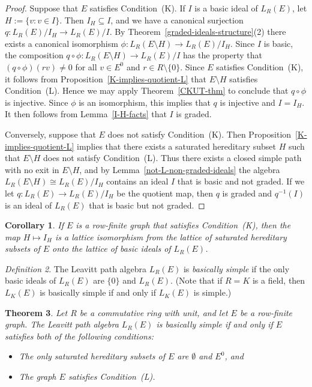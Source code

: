 \documentclass[11pt]{amsart}
\newtheorem{theorem}{Theorem}[section]
\newtheorem{corollary}[theorem]{Corollary}
\theoremstyle{remark}
\newtheorem{definition}[theorem]{Definition}
\numberwithin{equation}{section}
\begin{document}
\begin{proof}
Suppose that $E$ satisfies Condition~(K).  If $I$ is a basic ideal of $L_R(E)$, let $H := \{ v : v \in I \}$.  Then $I_H \subseteq I$, and we have a canonical surjection $q : L_R(E) / I_H \to L_R(E) / I$.  By Theorem~\ref{graded-ideals-structure}(2) there exists a canonical isomorphism $\phi : L_R(E \setminus H) \to L_R(E) / I_H$.  Since $I$ is basic, the composition $q \circ \phi : L_R(E \setminus H) \to L_R(E) / I$ has the property that $(q \circ \phi) (rv) \neq 0$ for all $v \in E^0$ and $r \in R \setminus \{ 0 \}$.  Since $E$ satisfies Condition~(K), it follows from Proposition~\ref{K-implies-quotient-L} that $E \setminus H$ satisfies Condition~(L).  Hence we may apply Theorem~\ref{CKUT-thm} to conclude that $q \circ \phi$ is injective.  Since $\phi$ is an isomorphism, this implies that $q$ is injective and $I = I_H$.  It then follows from Lemma~\ref{I-H-facts} that $I$ is graded.

Conversely, suppose that $E$ does not satisfy Condition~(K).  Then Proposition~\ref{K-implies-quotient-L} implies that there exists a saturated hereditary subset $H$ such that $E \setminus H$ does not satisfy Condition~(L).  Thus there exists a closed simple path with no exit in $E \setminus H$, and by Lemma~\ref{not-L-non-graded-ideals} the algebra $L_R(E \setminus H) \cong L_R(E)/ I_H$ contains an ideal $I$ that is basic and not graded.  If we let $q : L_R(E) \to L_R(E)/ I_H$ be the quotient map, then $q$ is graded and $q^{-1}(I)$ is an ideal of $L_R(E)$ that is basic but not graded.
\end{proof}

\begin{corollary}
If $E$ is a row-finite graph that satisfies Condition~(K), then the map $H \mapsto I_H$ is a lattice isomorphism from the lattice of saturated hereditary subsets of $E$ onto the lattice of basic ideals of $L_R(E)$.  
\end{corollary}

\begin{definition}
The Leavitt path algebra $L_R(E)$ is \emph{basically simple} if the only basic ideals of $L_R(E)$ are $\{ 0 \}$ and $L_R(E)$.  (Note that if $R = K$ is a field, then $L_K(E)$ is basically simple if and only if $L_K(E)$ is simple.)
\end{definition}

\begin{theorem} \label{bas-simp-cond-thm}
Let $R$ be a commutative ring with unit, and let $E$ be a row-finite graph.  The Leavitt path algebra $L_R(E)$ is basically simple if and only if $E$ satisfies both of the following  conditions:
\begin{itemize}
\item[(i)] The only saturated hereditary subsets of $E$ are $\emptyset$ and $E^0$, and
\item[(ii)] The graph $E$ satisfies Condition~(L).
\end{itemize}
\end{theorem}
\end{document}
